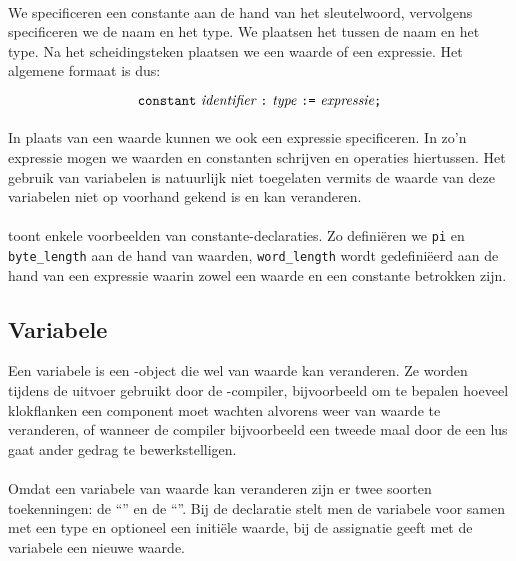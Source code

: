 \paragraph{}
We specificeren een constante aan de hand van het  sleutelwoord, vervolgens specificeren we de naam en het type. We plaatsen het \vhdltermen{:} tussen de naam en het type. Na het \vhdltermen{:=} scheidingsteken plaatsen we een waarde of een expressie. Het algemene formaat is dus:

\begin{equation}%
\vhdltermen{constant}\ \textit{identifier}\ \vhdltermen{:}\ \textit{type}\ \vhdltermen{:=}\ \textit{expressie}\vhdltermen{;}
\end{equation}

\paragraph{}
In plaats van een waarde kunnen we ook een expressie specificeren. In zo'n expressie mogen we waarden en constanten schrijven en operaties hiertussen. Het gebruik van variabelen is natuurlijk niet toegelaten vermits de waarde van deze variabelen niet op voorhand gekend is en kan veranderen.


\paragraph{}
 toont enkele voorbeelden van constante-declaraties. Zo defini\"eren we \texttt{pi} en \texttt{byte\_length} aan de hand van waarden, \texttt{word\_length} wordt gedefini\"eerd aan de hand van een expressie waarin zowel een waarde en een constante betrokken zijn.

\subsection{Variabele}
Een variabele is een \tvhdl{}-object die wel van waarde kan veranderen. Ze worden tijdens de uitvoer gebruikt door de \tvhdl{}-compiler, bijvoorbeeld om te bepalen hoeveel klokflanken een component moet wachten alvorens weer van waarde te veranderen, of wanneer de compiler bijvoorbeeld een tweede maal door de een lus gaat ander gedrag te bewerkstelligen.

\paragraph{}
Omdat een variabele van waarde kan veranderen zijn er twee soorten toekenningen: de ``'' en de ``''. Bij de declaratie stelt men de variabele voor samen met een type en optioneel een initi\"ele waarde, bij de assignatie geeft met de variabele een nieuwe waarde.

